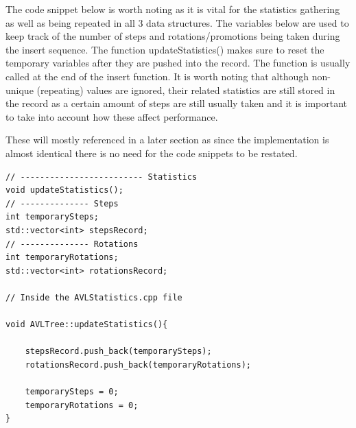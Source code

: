 \documentclass[12pt, a4paper]{report}
\begin{document}
The code snippet below is worth noting as it is vital for the statistics gathering as well as being repeated in all 3 data structures. The variables below are used to keep track of the number of steps and rotations/promotions being taken during the insert sequence. The function updateStatistics() makes sure to reset the temporary variables after they are pushed into the record. The function is usually called at the end of the insert function. It is worth noting that although non-unique (repeating) values are ignored, their related statistics are still stored in the record as a certain amount of steps are still usually taken and it is important to take into account how these affect performance.

These will mostly referenced in a later section as since the implementation is almost identical there is no need for the code snippets to be restated.
\begin{verbatim}
// ------------------------- Statistics
void updateStatistics();
// -------------- Steps
int temporarySteps;
std::vector<int> stepsRecord;
// -------------- Rotations
int temporaryRotations;
std::vector<int> rotationsRecord;

// Inside the AVLStatistics.cpp file

void AVLTree::updateStatistics(){

    stepsRecord.push_back(temporarySteps);
    rotationsRecord.push_back(temporaryRotations);
    
    temporarySteps = 0;
    temporaryRotations = 0;
}
\end{verbatim}
\end{document}
